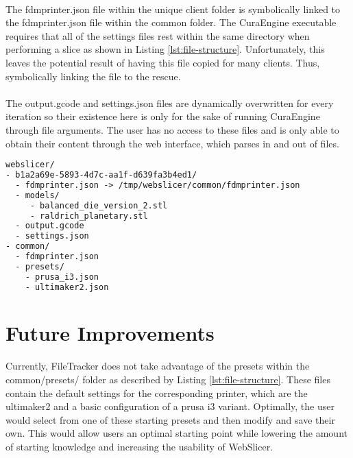 \paragraph{}
The fdmprinter.json file within the unique client folder is symbolically linked to the fdmprinter.json file within the common folder. 
The CuraEngine executable requires that all of the settings files rest within the same directory when performing a slice as shown in Listing \ref{lst:file-structure}.
Unfortunately, this leaves the potential result of having this file copied for many clients. 
Thus, symbolically linking the file to the rescue.

\paragraph{}
The output.gcode and settings.json files are dynamically overwritten for every iteration so their existence here is only for the sake of running CuraEngine through file arguments.
The user has no access to these files and is only able to obtain their content through the web interface, which parses in and out of files.

\begin{lstlisting}[language=html, style=thesiscode, label={lst:file-structure}, caption=WebSlicer's underlying file structure supported by FileTracker.]
webslicer/
- b1a2a69e-5893-4d7c-aa1f-d639fa3b4ed1/
  - fdmprinter.json -> /tmp/webslicer/common/fdmprinter.json
  - models/
     - balanced_die_version_2.stl
     - raldrich_planetary.stl
  - output.gcode
  - settings.json
- common/
  - fdmprinter.json
  - presets/
    - prusa_i3.json
    - ultimaker2.json
\end{lstlisting}

\section{Future Improvements}
\paragraph{}
Currently, FileTracker does not take advantage of the presets within the common/presets/ folder as described by Listing \ref{lst:file-structure}. 
These files contain the default settings for the corresponding printer, which are the ultimaker2 and a basic configuration of a prusa i3 variant. 
Optimally, the user would select from one of these starting presets and then modify and save their own.
This would allow users an optimal starting point while lowering the amount of starting knowledge and increasing the usability of WebSlicer.

